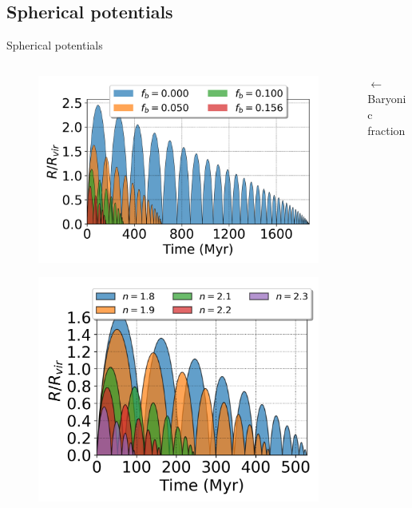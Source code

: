 \documentclass[handout]{beamer}
\begin{document}
\subsection{Spherical potentials}
\begin{frame}{Spherical potentials}
	\begin{columns}
		\begin{column}{0.4\textwidth}
			\begin{figure}[h]
				\centering
				\includegraphics[width=\linewidth]{"../Files/Week 5/baryonic_fraction_comparison_slides"}
			\end{figure}
			\begin{figure}[h]
				\centering
				\includegraphics[width = 0.9\linewidth]{"../Files/Week 6/power_law_slides"}
			\end{figure}
		\end{column}
		\begin{column}{0.7\textwidth}
			$\longleftarrow$ Baryonic fraction
			

\end{column}
\end{columns}
\end{frame}
\end{document}
